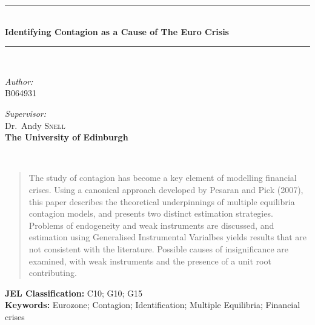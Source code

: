 \documentclass[/../base.tex]{subfiles}
\begin{document}
\begin{center}
\rule{1\textwidth}{2pt}\\
{ \LARGE \bfseries Identifying Contagion as a Cause of The Euro Crisis  \\[0.2cm] }
\rule{1\textwidth}{2pt}\\[2cm]

\noindent
\begin{minipage}[t]{0.45\textwidth}
\begin{flushleft} \large
\emph{Author:}\\
\textsc{B064931}\\
\textbf{}
\end{flushleft}
\end{minipage}%
\begin{minipage}[t]{0.4\textwidth}
\begin{flushright} \large
\emph{Supervisor:} \\
Dr.~Andy \textsc{Snell}\\
\textbf{The University of Edinburgh}

\end{flushright}
\end{minipage}\\

\vfill


    \begin{abstract}
		 The study of contagion has become a key element of modelling financial crises. Using a canonical approach developed by Pesaran and Pick (2007), this paper describes the theoretical underpinnings of multiple equilibria contagion models, and presents two distinct estimation strategies. Problems of endogeneity and weak instruments are discussed, and estimation using Generalised Instrumental Varialbes yields results that are not consistent with the literature. Possible causes of insignificance are examined, with weak instruments and the presence of a unit root contributing.  
    \end{abstract}

\end{center}
\vfill

\noindent
\textbf{JEL Classification:} C10; G10; G15 \\
\textbf{Keywords:} Eurozone; Contagion; Identification; Multiple Equilibria; Financial crises
\end{document}
